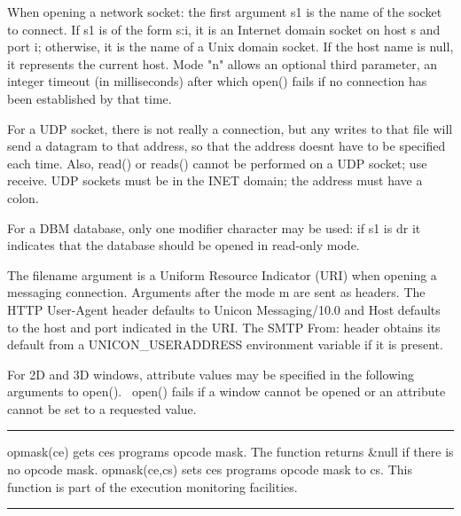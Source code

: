 When opening a network socket: the first argument \textsf{s1} is the
name of the socket to connect. If \textsf{s1} is of the form
{\textquotedbl}s:i{\textquotedbl}, it is an Internet domain socket on
host s and port i; otherwise, it is the name of a Unix
domain socket. If the host name is null, it represents the current
host. Mode "n" allows an optional third parameter,
an integer timeout (in milliseconds) after which \textsf{open()} fails
if no connection has been established by that time.

For a UDP socket, there is not really a connection, but any writes to
that file will send a datagram to that address, so that the address
doesn{\textquotesingle}t have to be specified each time. Also,
\textsf{read()} or \textsf{reads()} cannot be performed on a UDP
socket; use receive. UDP sockets must be in the INET domain; the
address must have a colon. 

For a DBM database, only one modifier character may be used: if
\textsf{s1} is \textsf{{\textquotedbl}dr{\textquotedbl}} it indicates
that the database should be opened in read-only mode. 

The filename argument is a Uniform Resource Indicator (URI) when opening
a messaging connection. Arguments after the mode
{\textquotedbl}m{\textquotedbl} are sent as headers. The HTTP
User-Agent header defaults to {\textquotedbl}Unicon
Messaging/10.0{\textquotedbl} and Host defaults to the host and port
indicated in the URI. The SMTP From: header obtains its default from a
UNICON\_USERADDRESS environment variable if it is present.

For 2D and 3D windows, attribute values may be specified in the
following arguments to \textsf{open()}. \ \textsf{open()} fails if a
window cannot be opened or an attribute cannot be set to a requested
value.

\bigskip\hrule\vspace{0.1cm}

\noindent
\textsf{opmask(ce)} gets \textsf{ce}{\textquotesingle}s
program{\textquotesingle}s opcode mask. The function returns
\textsf{\&null} if there is no opcode mask. \textsf{opmask(ce,cs)} sets
\textsf{ce}{\textquotesingle}s program{\textquotesingle}s opcode mask
to \textsf{cs}. This function is part of the execution monitoring
facilities.

\bigskip\hrule\vspace{0.1cm}

